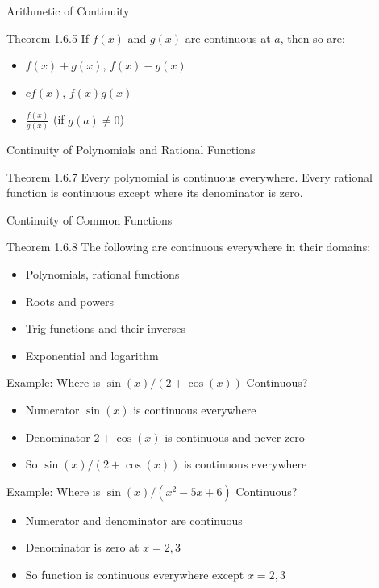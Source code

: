 \documentclass[aspectratio=169]{beamer}
\begin{document}
\begin{frame}{Arithmetic of Continuity}
\begin{block}{Theorem 1.6.5}
If $f(x)$ and $g(x)$ are continuous at $a$, then so are:
\begin{itemize}
  \item $f(x) + g(x)$, $f(x) - g(x)$
  \item $c f(x)$, $f(x)g(x)$
  \item $\frac{f(x)}{g(x)}$ (if $g(a) \neq 0$)
\end{itemize}
\end{block}
\end{frame}

\begin{frame}{Continuity of Polynomials and Rational Functions}
\begin{block}{Theorem 1.6.7}
Every polynomial is continuous everywhere. Every rational function is continuous except where its denominator is zero.
\end{block}
\end{frame}

\begin{frame}{Continuity of Common Functions}
\begin{block}{Theorem 1.6.8}
The following are continuous everywhere in their domains:
\begin{itemize}
  \item Polynomials, rational functions
  \item Roots and powers
  \item Trig functions and their inverses
  \item Exponential and logarithm
\end{itemize}
\end{block}
\end{frame}

\begin{frame}{Example: Where is $\sin(x)/(2+\cos(x))$ Continuous?}
\begin{itemize}
  \item Numerator $\sin(x)$ is continuous everywhere
  \item Denominator $2+\cos(x)$ is continuous and never zero
  \item So $\sin(x)/(2+\cos(x))$ is continuous everywhere
\end{itemize}
\end{frame}

\begin{frame}{Example: Where is $\sin(x)/(x^2-5x+6)$ Continuous?}
\begin{itemize}
  \item Numerator and denominator are continuous
  \item Denominator is zero at $x=2,3$
  \item So function is continuous everywhere except $x=2,3$
\end{itemize}
\end{frame}
\end{document}
